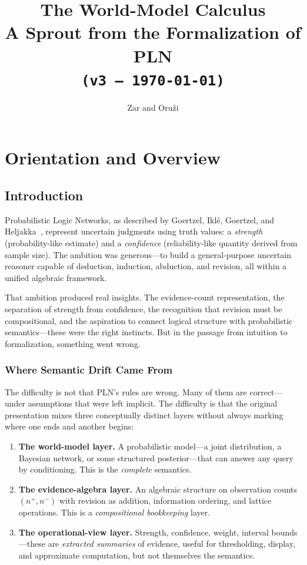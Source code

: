 \documentclass[11pt,openany]{report}
\title{The World-Model Calculus\\[6pt]
  \large A Sprout from the Formalization of PLN\\[12pt]
  \normalsize\texttt{(v3 --- \today)}}
\author{Zar and Oru\v{z}i}
\date{}
\begin{document}
\maketitle
\tableofcontents


\part{Orientation and Overview}
\label{part:orientation}

\chapter{Introduction}
\label{ch:introduction}

Probabilistic Logic Networks, as described by Goertzel, Iklé,
Goertzel, and Heljakka~\cite{goertzel2009pln}, represent uncertain
judgments using truth values: a \emph{strength} (probability-like
estimate) and a \emph{confidence} (reliability-like quantity derived
from sample size).  The ambition was generous---to build a
general-purpose uncertain reasoner capable of deduction, induction,
abduction, and revision, all within a unified algebraic framework.

That ambition produced real insights.  The evidence-count
representation, the separation of strength from confidence, the
recognition that revision must be compositional, and the aspiration to
connect logical structure with probabilistic semantics---these were the
right instincts.  But in the passage from intuition to formalization,
something went wrong.

\section{Where Semantic Drift Came From}

The difficulty is not that PLN's rules are wrong.  Many of them are
correct---under assumptions that were left implicit.  The difficulty is
that the original presentation mixes three conceptually distinct layers
without always marking where one ends and another begins:

\begin{enumerate}
\item \textbf{The world-model layer.}  A probabilistic model---a joint
  distribution, a Bayesian network, or some structured posterior---that
  can answer any query by conditioning.  This is the \emph{complete}
  semantics.

\item \textbf{The evidence-algebra layer.}  An algebraic structure on
  observation counts $(n^+, n^-)$ with revision as addition,
  information ordering, and lattice operations.  This is a
  \emph{compositional bookkeeping} layer.

\item \textbf{The operational-view layer.}  Strength, confidence,
  weight, interval bounds---these are \emph{extracted summaries} of
  evidence, useful for thresholding, display, and approximate
  computation, but not themselves the semantics.
\end{enumerate}
\end{document}
